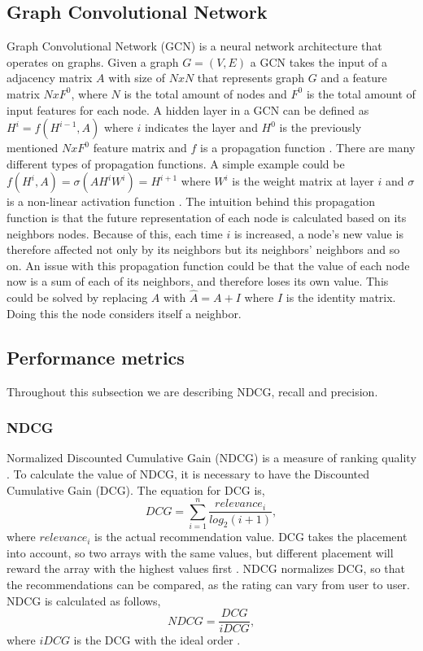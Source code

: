 \subsection{Graph Convolutional Network}
Graph Convolutional Network (GCN) is a neural network architecture that operates on graphs.
Given a graph $G = (V,E)$ a GCN takes the input of a adjacency
matrix $A$ with size of $N x N$ that represents graph $G$ and a feature matrix $N x F^0$, where $N$ is the total amount of nodes and $F^0$ is the total amount of input features for each node.
A hidden layer in a GCN can be defined as $H^i = f(H^{i-1}, A)$ where $i$ indicates the layer and $H^0$ is the previously mentioned $N x F^0$ feature matrix and $f$ is a propagation function \cite{Deep-Learning-on-Graphs-with-GCN}.
There are many different types of propagation functions.
A simple example could be $f(H^i, A) = \sigma(AH^iW^i) = H^{i+1}$ where $W^i$ is the weight matrix at layer $i$ and $\sigma$ is a non-linear activation function \cite{Deep-Learning-on-Graphs-with-GCN}.
The intuition behind this propagation function is that the future representation of each node is calculated based on its neighbors nodes.
Because of this, each time $i$ is increased, a node's new value is therefore affected not only by its neighbors but its neighbors' neighbors and so on.
An issue with this propagation function could be that the value of each node now is a sum of each of its neighbors, and therefore loses its own value.
This could be solved by replacing $A$ with $\hat{A} = A + I$ where $I$ is the identity matrix.
Doing this the node considers itself a neighbor.

\subsection{Performance metrics}
Throughout this subsection we are describing NDCG, recall and precision.

\subsubsection{NDCG}
Normalized Discounted Cumulative Gain (NDCG) is a measure of ranking quality \cite{NDCG-evaluation}.
To calculate the value of NDCG, it is necessary to have the Discounted Cumulative Gain (DCG).
The equation for DCG is,
\begin{equation}
    DCG = \sum_{i=1}^{n} \frac{relevance_i}{log_2(i+1)},
\end{equation}
where $relevance_i$ is the actual recommendation value.
DCG takes the placement into account, so two arrays with the same values, but different placement will reward the array with the highest values first \cite{NDCG-evaluation,Handbook}.
NDCG normalizes DCG, so that the recommendations can be compared, as the rating can vary from user to user.
NDCG is calculated as follows,
\begin{equation}
    NDCG = \frac{DCG}{iDCG},
\end{equation}
where $iDCG$ is the DCG with the ideal order \cite{NDCG-evaluation,Handbook}.

